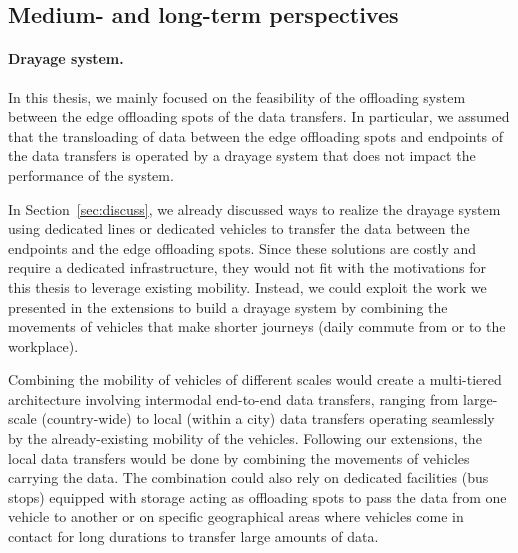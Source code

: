 \subsection{Medium- and long-term perspectives}

\paragraph{Drayage system.}
In this thesis, we mainly focused on the feasibility of the offloading system between the edge offloading spots of the data transfers. In particular, we assumed that the transloading of data between the edge offloading spots and endpoints of the data transfers is operated by a drayage system that does not impact the performance of the system.

In Section~\ref{sec:discuss}, we already discussed ways to realize the drayage system using dedicated lines or dedicated vehicles to transfer the data between the endpoints and the edge offloading spots. Since these solutions are costly and require a dedicated infrastructure, they would not fit with the motivations for this thesis to leverage existing mobility. Instead, we could exploit the work we presented in the extensions to build a drayage system by combining the movements of vehicles that make shorter journeys (\eg daily commute from or to the workplace). 

Combining the mobility of vehicles of different scales would create a multi-tiered architecture involving intermodal end-to-end data transfers, ranging from large-scale (\eg country-wide) to local (\eg within a city) data transfers operating seamlessly by the already-existing mobility of the vehicles. Following our extensions, the local data transfers would be done by combining the movements of vehicles carrying the data. The combination could also rely on dedicated facilities (\eg bus stops) equipped with storage acting as offloading spots to pass the data from one vehicle to another or on specific geographical areas where vehicles come in contact for long durations to transfer large amounts of data.

\clearpage
